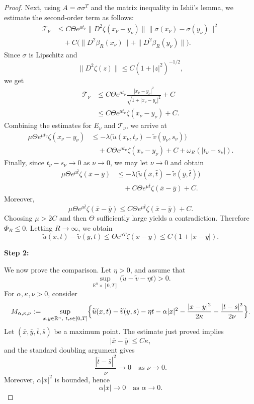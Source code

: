 \documentclass[10pt,a4paper]{amsart}
\begin{document}
\begin{proof}
Next, using \(A=\sigma\sigma^T\) and the matrix inequality in Ishii's lemma, we estimate the second-order term as follows:
\[
\begin{aligned}
 \mathcal T_\nu
 &\le
 C\Theta e^{\mu t_\nu}
 \|D^2\zeta(x_\nu-y_\nu)\|
 \|\sigma(x_\nu)-\sigma(y_\nu)\|^2
 \\
 &\quad+
 C\bigl(
 \|D^2\beta_R(x_\nu)\|
 +
 \|D^2\beta_R(y_\nu)\|
 \bigr).
\end{aligned}
\]
Since \(\sigma\) is Lipschitz and
\[
 \|D^2\zeta(z)\|\le C(1+|z|^2)^{-1/2},
\]
we get
\[
\begin{aligned}
 \mathcal T_\nu
 &\le
 C\Theta e^{\mu t_\nu}
 \frac{|x_\nu-y_\nu|^2}{\sqrt{1+|x_\nu-y_\nu|^2}}
 +
 C
 \\
 &\le
 C\Theta e^{\mu t_\nu}\zeta(x_\nu-y_\nu)+C.
\end{aligned}
\]
Combining the estimates for \(E_\nu\) and \(\mathcal T_\nu\), we arrive at
\[
\begin{aligned}
 \mu\Theta e^{\mu t_\nu}\zeta(x_\nu-y_\nu)
 &\le
 -\lambda\bigl(
 \widetilde u(x_\nu,t_\nu)-\widetilde v(y_\nu,s_\nu)
 \bigr)
 \\
 &\quad+
 C\Theta e^{\mu t_\nu}\zeta(x_\nu-y_\nu)
 +
 C
 +
 \omega_R(|t_\nu-s_\nu|).
\end{aligned}
\]
Finally, since \(t_\nu-s_\nu\to0\) as \(\nu\to0\), we may let \(\nu\to0\) and obtain
\[
\begin{aligned}
 \mu\Theta e^{\mu \bar t}\zeta(\bar x-\bar y)
 &\le
 -\lambda\bigl(
 \widetilde u(\bar x,\bar t)-\widetilde v(\bar y,\bar t)
 \bigr)
 \\
 &\quad+
 C\Theta e^{\mu \bar t}\zeta(\bar x-\bar y)
 +
 C.
\end{aligned}
\]
Moreover,
\[
 \mu\Theta e^{\mu\bar t}\zeta(\bar x-\bar y)
 \le
 C\Theta e^{\mu\bar t}\zeta(\bar x-\bar y)+C.
\]
Choosing \(\mu>2C\) and then \(\Theta\) sufficiently large yields a contradiction. Therefore $\Phi_R\le0.$
Letting \(R\to\infty\), we obtain
\[
 \widetilde u(x,t)-\widetilde v(y,t)
 \le
 \Theta e^{\mu T}\zeta(x-y)
 \le
 C(1+|x-y|).
\]

\textbf{Step 2:}

We now prove the comparison. Let \(\eta>0\), and assume that
\[
 \sup_{\mathbb R^n\times[0,T]}
 \bigl(\widetilde u-\widetilde v-\eta t\bigr)>0.
\]
For \(\alpha,\kappa,\nu>0\), consider
\[
\begin{aligned}
 M_{\alpha,\kappa,\nu}
 :=
 \sup_{x,y\in\mathbb R^n,\ t,s\in[0,T]}
 \Bigl\{
 \widetilde u(x,t)-\widetilde v(y,s)
 -
 \eta t
 -
 \alpha|x|^2
 -
 \frac{|x-y|^2}{2\kappa}
 -
 \frac{|t-s|^2}{2\nu}
 \Bigr\}.
\end{aligned}
\]
Let \((\bar x,\bar y,\bar t,\bar s)\) be a maximum point. The estimate just proved implies
\[
 |\bar x-\bar y|\le C\kappa,
\]
and the standard doubling argument gives
\[
 \frac{|\bar t-\bar s|^2}{\nu}\to0
 \quad\text{as }\nu\to0.
\]
Moreover, $ \alpha|\bar x|^2$
is bounded, hence
\[
 \alpha|\bar x|\to0
 \quad\text{as }\alpha\to0.
\]


\end{proof}
\end{document}
